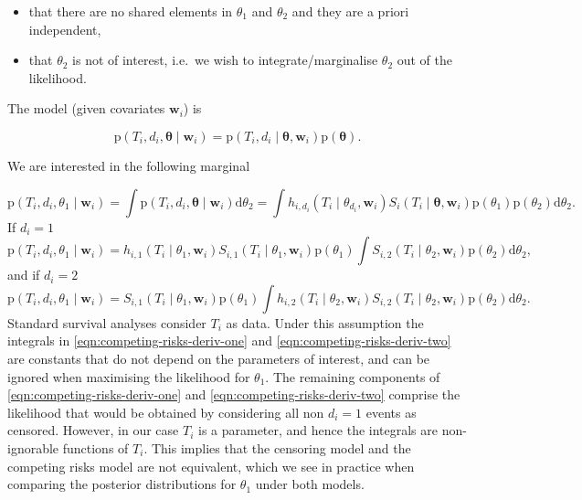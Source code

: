 \documentclass[
  10pt,
  a4paper,
]{article}
\providecommand{\tightlist}{%
  \setlength{\itemsep}{0pt}\setlength{\parskip}{0pt}}
\newcommand{\pd}{\text{p}}
\begin{document}
\begin{itemize}
\tightlist
\item
  that there are no shared elements in \(\theta_{1}\) and \(\theta_{2}\)
  and they are a priori independent,
\item
  that \(\theta_{2}\) is not of interest, i.e.~we wish to
  integrate/marginalise \(\theta_{2}\) out of the likelihood.
\end{itemize}

The model (given covariates \(\boldsymbol{w}_{i}\)) is

\begin{equation}
  \pd(T_{i}, d_{i}, \boldsymbol{\theta} \mid \boldsymbol{w}_{i}) =
    \pd(T_{i}, d_{i} \mid \boldsymbol{\theta}, \boldsymbol{w}_{i})\pd(\boldsymbol{\theta}).
\end{equation}

We are interested in the following marginal

\begin{equation}
  \pd(T_{i}, d_{i}, \theta_{1} \mid \boldsymbol{w}_{i})
  = \int \pd(T_{i}, d_{i}, \boldsymbol{\theta} \mid \boldsymbol{w}_{i}) \text{d}\theta_{2}
  = \int h_{i, d_{i}}(T_{i} \mid \theta_{d_{i}}, \boldsymbol{w}_{i}) S_{i}(T_{i} \mid \boldsymbol{\theta}, \boldsymbol{w}_{i}) \pd(\theta_{1}) \pd(\theta_{2}) \text{d}\theta_{2}.
\end{equation} If \(d_{i} = 1\) \begin{equation}
  \pd(T_{i}, d_{i}, \theta_{1} \mid \boldsymbol{w}_{i})
  = h_{i, 1}(T_{i} \mid \theta_{1}, \boldsymbol{w}_{i}) S_{i, 1}(T_{i} \mid \theta_{1}, \boldsymbol{w}_{i}) \pd(\theta_{1}) \int S_{i, 2}(T_{i} \mid \theta_{2}, \boldsymbol{w}_{i}) \pd(\theta_{2}) \text{d} \theta_{2},
  \label{eqn:competing-risks-deriv-one}
\end{equation} and if \(d_{i} = 2\) \begin{equation}
  \pd(T_{i}, d_{i}, \theta_{1} \mid \boldsymbol{w}_{i})
  = S_{i, 1}(T_{i} \mid \theta_{1}, \boldsymbol{w}_{i}) \pd(\theta_{1}) \int h_{i, 2}(T_{i} \mid \theta_{2}, \boldsymbol{w}_{i}) S_{i, 2}(T_{i} \mid \theta_{2}, \boldsymbol{w}_{i}) \pd(\theta_{2}) \text{d} \theta_{2}.
  \label{eqn:competing-risks-deriv-two}
\end{equation} Standard survival analyses consider \(T_{i}\) as data.
Under this assumption the integrals in
\eqref{eqn:competing-risks-deriv-one} and
\eqref{eqn:competing-risks-deriv-two} are constants that do not depend
on the parameters of interest, and can be ignored when maximising the
likelihood for \(\theta_{1}\). The remaining components of
\eqref{eqn:competing-risks-deriv-one} and
\eqref{eqn:competing-risks-deriv-two} comprise the likelihood that would
be obtained by considering all non \(d_{i} = 1\) events as censored.
However, in our case \(T_{i}\) is a parameter, and hence the integrals
are non-ignorable functions of \(T_{i}\). This implies that the
censoring model and the competing risks model are not equivalent, which
we see in practice when comparing the posterior distributions for
\(\theta_{1}\) under both models.
\end{document}
